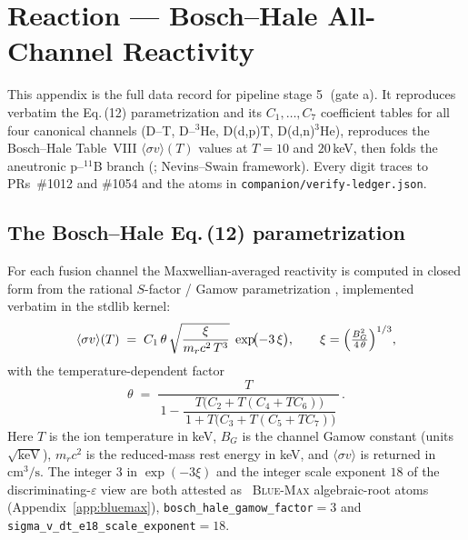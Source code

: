 \section{Reaction --- Bosch--Hale All-Channel Reactivity}
\label{app:reaction}

This appendix is the full data record for pipeline stage
\textcircled{\scriptsize 5} (gate a). It reproduces verbatim the
\citet{boschhale1992} Eq.\,(12) parametrization and its $C_1,\dots,C_7$
coefficient tables for all four canonical channels (D--T, D--$^3$He,
D(d,p)T, D(d,n)$^3$He), reproduces the Bosch--Hale Table~VIII
$\langle\sigma v\rangle(T)$ values at $T=10$ and $20$\,keV, then folds the
aneutronic p--$^{11}$B branch (\citet{tentori2023pb11}; Nevins--Swain
framework). Every digit traces to PRs~\#1012 and \#1054 and the atoms in
\texttt{companion/verify-ledger.json}.

\subsection{The Bosch--Hale Eq.\,(12) parametrization}
\label{app:bh-eq}

For each fusion channel the Maxwellian-averaged reactivity is computed in
closed form from the rational $S$-factor / Gamow parametrization
\citep{boschhale1992}, implemented verbatim in the stdlib kernel:
\begin{equation}
\langle\sigma v\rangle(T)
  \;=\;
  C_1\,\theta\,
  \sqrt{\frac{\xi}{m_r c^2\,T^{3}}}\;
  \exp\!\bigl(-3\,\xi\bigr),
\qquad
\xi=\Bigl(\tfrac{B_G^{2}}{4\,\theta}\Bigr)^{1/3},
\label{eq:bh}
\end{equation}
with the temperature-dependent factor
\begin{equation}
\theta
  \;=\;
  \frac{T}
       {\,1 - \dfrac{T\bigl(C_2 + T(C_4 + T C_6)\bigr)}
                     {\,1 + T\bigl(C_3 + T(C_5 + T C_7)\bigr)}\,}\,.
\label{eq:theta}
\end{equation}
Here $T$ is the ion temperature in keV, $B_G$ is the channel Gamow constant
(units $\sqrt{\text{keV}}$), $m_r c^2$ is the reduced-mass rest energy in
keV, and $\langle\sigma v\rangle$ is returned in $\text{cm}^3/\text{s}$.
The integer $3$ in $\exp(-3\xi)$ and the integer scale exponent $18$ of the
discriminating-$\varepsilon$ view are both attested as
\tierBlue\ \textsc{Blue-Max} algebraic-root atoms (Appendix~\ref{app:bluemax}),
\verb|bosch_hale_gamow_factor|$=3$ and
\verb|sigma_v_dt_e18_scale_exponent|$=18$.

